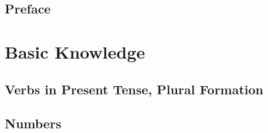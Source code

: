 \documentclass{book}
\title{\q{   }}
\author{Thorsten Renk}
\date{Version 2.0 (September 23, 2008)}
\begin{document}
\frontmatter
\maketitle
\tableofcontents

\chapter{Preface}


\mainmatter
\part{Basic Knowledge}
\chapter{Verbs in Present Tense, Plural Formation}



\appendix
\chapter{}


\chapter{Numbers}


\backmatter
\end{document}
